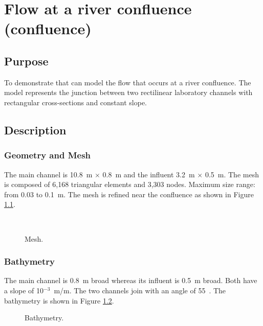 \chapter{Flow at a river confluence (confluence)}

\section{Purpose}

To demonstrate that  can model the flow that occurs at a river
confluence.
The model represents the junction between two rectilinear laboratory channels
with rectangular cross-sections and constant slope.

\section{Description}

\subsection{Geometry and Mesh}

The main channel is 10.8~m $\times$ 0.8~m and the influent 3.2~m $\times$ 0.5~m.
The mesh is composed of 6,168 triangular elements and 3,303 nodes. 
Maximum size range: from 0.03 to 0.1~m.
The mesh is refined near the confluence as shown in Figure
\ref{t2d:confluence:mesh}.

\begin{figure}[H]
  \centering
  \\
  \caption{Mesh.}\label{t2d:confluence:mesh}
\end{figure}

\subsection{Bathymetry}

The main channel is 0.8~m broad whereas its influent is 0.5~m broad.
Both have a slope of 10$^{-3}$~m/m.
The two channels join with an angle of 55~\degree{}.
The bathymetry is shown in Figure \ref{t2d:confluence:bathy}.

\begin{figure}[H]
  \centering
  \caption{Bathymetry.}\label{t2d:confluence:bathy}
\end{figure}

